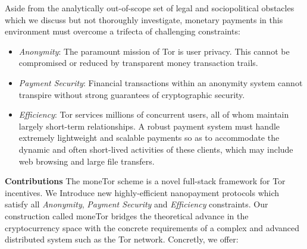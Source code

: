 Aside from the analytically out-of-scope set of legal and
sociopolitical obstacles which we discuss but not thoroughly investigate, monetary payments in this environment must overcome a
trifecta of challenging constraints:

\begin{itemize}
\item \emph{Anonymity}: The paramount mission of Tor is user privacy. This
  cannot be compromised or reduced by transparent money transaction trails.
\item \emph{Payment Security}: Financial transactions within an anonymity system cannot transpire
  without strong guarantees of cryptographic security.
\item \emph{Efficiency}: Tor services millions of concurrent users, all of whom
  maintain largely short-term relationships. A robust payment system must handle
  extremely lightweight and scalable payments so as to accommodate the dynamic
  and often short-lived activities of these clients, which may include web
  browsing and large file transfers.
\end{itemize}


\label{sec:Contributions}
\textbf{Contributions} The moneTor scheme is a novel full-stack framework for
Tor incentives. We Introduce new highly-efficient nanopayment protocols which satisfy all \emph{Anonymity}, \emph{Payment Security} and \emph{Efficiency} constraints.
 Our construction called moneTor bridges the theoretical advance in the cryptocurrency space with the concrete requirements of a complex and advanced distributed system such as the Tor network. Concretly, we offer:
 
